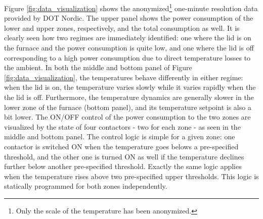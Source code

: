 \documentclass[lettersize,journal]{IEEEtran}
\begin{document}
Figure \ref{fig:data_visualization} shows the anonymized\footnote{Only the scale of the temperature has been anonymized.} one-minute resolution data provided by DOT Nordic. The upper panel shows the power consumption of the lower and upper zones, respectively, and the total consumption as well. It is clearly seen how two regimes are immediately identified: one where the lid is on the furnace and the power consumption is quite low, and one where the lid is off corresponding to a high power consumption due to direct temperature losses to the ambient. In both the middle and bottom panel of Figure \ref{fig:data_visualization}, the temperatures behave differently in either regime: when the lid is on, the temperature varies slowly while it varies rapidly when the the lid is off. Furthermore, the temperature dynamics are generally slower in the lower zone of the furnace (bottom panel), and its temperature setpoint is also a bit lower. The ON/OFF control of the power consumption to the two zones are visualized by the state of four contactors - two for each zone - as seen in the middle and bottom panel. The control logic is simple for a given zone: one contactor is switched ON when the temperature goes belows a pre-specified threshold, and the other one is turned ON as well if the temperature declines further below another pre-specified threshold. Exactly the same logic applies when the temperature rises above two pre-specified upper thresholds. This logic is statically programmed for both zones independently.
\end{document}
